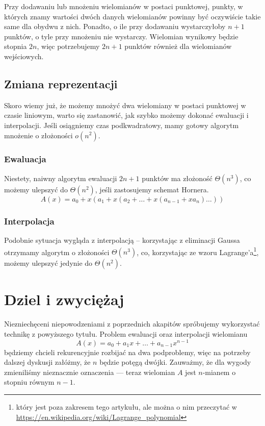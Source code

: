 \documentclass[11pt]{scrartcl}
\begin{document}
    \begin{remark}
        Przy dodawaniu lub mnożeniu wielomianów w postaci punktowej, punkty, w których znamy wartości dwóch danych wielomianów powinny być oczywiście takie same dla obydwu z nich. Ponadto, o ile przy dodawaniu wystarczyłoby $n + 1$ punktów, o tyle przy mnożeniu nie wystarczy. Wielomian wynikowy będzie stopnia $2n$, więc potrzebujemy $2n + 1$ punktów również dla wielomianów wejściowych.
    \end{remark}

    \subsection{Zmiana reprezentacji}
    Skoro wiemy już, że możemy mnożyć dwa wielomiany w postaci punktowej w czasie liniowym, warto się zastanowić, jak szybko możemy dokonać ewaluacji i interpolacji. Jeśli osiągniemy czas podkwadratowy, mamy gotowy algorytm mnożenie o złożoności $o(n^2)$.

    \subsubsection*{Ewaluacja}
    Niestety, naiwny algorytm ewaluacji $2n + 1$ punktów ma złożoność $\Theta(n^3)$, co możemy ulepszyć do $\Theta(n^2)$, jeśli zastosujemy schemat Hornera.
    $$ A(x) = a_0 + x(a_1 + x(a_2 + \ldots + x(a_{n-1} + xa_n)\ldots))$$

    \subsubsection*{Interpolacja}
    Podobnie sytuacja wygląda z interpolacją -- korzystając z eliminacji Gaussa otrzymamy algorytm o złożoności $\Theta(n^3)$, co, korzystając ze wzoru Lagrange'a\footnote{który jest poza zakresem tego artykułu, ale można o nim przeczytać w \url{https://en.wikipedia.org/wiki/Lagrange_polynomial}}, możemy ulepszyć jedynie do $\Theta(n^2)$.

\section{Dziel i zwyciężaj}
    Niezniechęceni niepowodzeniami z poprzednich akapitów spróbujemy wykorzystać technikę z powyższego tytułu. Problem ewaluacji oraz interpolacji wielomianu
    $$ A(x) = a_0 + a_1x + \ldots + a_{n-1}x^{n-1} $$
    będziemy chcieli rekurencyjnie rozbijać na dwa podproblemy, więc na potrzeby dalszej dyskusji załóżmy, że $n$ będzie potęgą dwójki. Zauważmy, że dla wygody zmieniliśmy nieznacznie oznaczenia --- teraz wielomian $A$ jest $n$-mianem o stopniu równym $n-1$.
\end{document}

